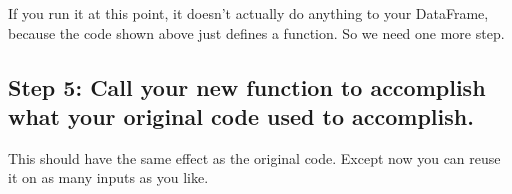 \documentclass[letterpaper,10pt,english]{jupyterBook}
\begin{document}
\sphinxAtStartPar
If you run it at this point, it doesn’t actually do anything to your DataFrame, because the code shown above just defines a function.  So we need one more step.


\subsection{Step 5:  Call your new function to accomplish what your original code used to accomplish.}
\label{\detokenize{chapter-7-abstraction:step-5-call-your-new-function-to-accomplish-what-your-original-code-used-to-accomplish}}
\begin{sphinxVerbatim}[commandchars=\\\{\}]
     
    \PYG{p}{[}\PYG{p}{]}  \PYG{p}{[}\PYG{p}{]}    
    \PYG{p}{[}\PYG{p}{]}  \PYG{p}{[}\PYG{p}{]}    
    \PYG{p}{[}\PYG{p}{]}  \PYG{p}{[}\PYG{p}{]}       

     
\end{sphinxVerbatim}

\sphinxAtStartPar
This should have the same effect as the original code.  Except now you can re\sphinxhyphen{}use it on as many inputs as you like.

\begin{sphinxVerbatim}[commandchars=\\\{\}]
   
   
   
\end{sphinxVerbatim}
\end{document}
